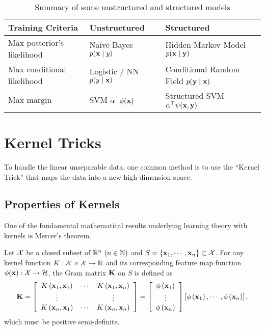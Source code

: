 \begin{table}[hbtp]
\center
{
\centering
\caption{Summary of some unstructured and structured models}
\begin{tabular}{l l l}
\toprule
\textbf{Training Criteria} & \textbf{Unstructured} & \textbf{Structured}	\\
\midrule
Max posterior's likelihood & Naive Bayes $p(\mathbf{x} \mid y)$ & Hidden Markov Model $p(\mathbf{x} \mid \mathbf{y})$ \\
Max conditional likelihood  & Logistic / NN $p(y \mid \mathbf{x})$ & Conditional Random Field $p(\mathbf{y} \mid \mathbf{x})$ \\
Max margin & SVM $ \alpha^\top \phi(\mathbf{x})$ & Structured SVM $ \alpha^\top \psi(\mathbf{x}, \mathbf{y})$ \\
\bottomrule
\end{tabular}
}\end{table}


\newpage
\chapter{Kernel Tricks}
To handle the linear unseparable data, one common method is to use the ``Kernel Trick'' that maps the data into a new high-dimension space.

\section{Properties of Kernels}
One of the fundamental mathematical results underlying learning theory with kernels is Mercer's theorem.
\begin{definition}
	Let $\mathcal{X}$ be a closed subset of $ \mathbb{R}^n\ (n \in \mathbb{N})$ and $S = \{ \mathbf{x}_1, \cdots, \mathbf{x}_n\} \subset \mathcal{X}$. For any kernel function $K: \mathcal{X} \times \mathcal{X} \rightarrow \mathbb{R}$ and its corresponding feature map function $\phi(\mathbf{x}): \mathcal{X} \rightarrow \mathcal{H}$, the Gram matrix $\mathbf{K}$ on $S$ is defined as
	$$
	\mathbf{K} =\left[\begin{array}{ccc}
K\left(\mathbf{x}_{1}, \mathbf{x}_{1}\right) & \cdots & K\left(\mathbf{x}_{1}, \mathbf{x}_{n}\right) \\
\vdots & & \vdots \\
K\left(\mathbf{x}_{n}, \mathbf{x}_{1}\right) & \cdots & K\left(\mathbf{x}_{n}, \mathbf{x}_{n}\right)
\end{array}\right] = \left[\begin{array}{c}
\phi\left(\mathbf{x}_{1}\right) \\
\vdots \\
\phi\left(\mathbf{x}_{n}\right)
\end{array}\right] \left[\phi\left(\mathbf{x}_{1}\right), \cdots, \phi\left(\mathbf{x}_{n}\right)  \right],
	$$
	which must be positive semi-definite.
\end{definition}

